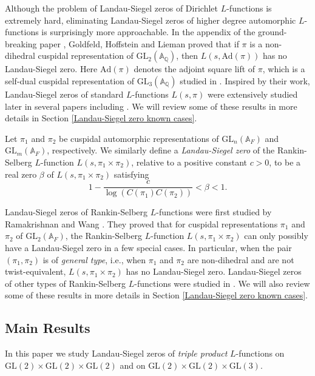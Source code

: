 \documentclass[12pt]{amsart}
\newcommand{\bA}{\mathbb{A}}
\newcommand{\Ad}{\text{Ad}}
\newcommand{\bQ}{\mathbb{Q}}
\newcommand{\GL}{\text{GL}}
\begin{document}
Although the problem of Landau-Siegel zeros of Dirichlet $L$-functions is extremely hard, eliminating Landau-Siegel zeros of higher degree automorphic $L$-functions is surprisingly more approachable. In the appendix of the ground-breaking paper \cite{HoffsteinLockhart1994}, Goldfeld, Hoffstein and Lieman proved that if $\pi$ is a non-dihedral cuspidal representation of $\GL_2(\bA_\bQ)$, then $L(s,\Ad(\pi))$ has no Landau-Siegel zero. Here $\Ad(\pi)$ denotes the adjoint square lift of $\pi$, which is a self-dual cuspidal representation of $\GL_3(\bA_\bQ)$ studied in \cite{GelbartJacquet1978}. Inspired by their work, Landau-Siegel zeros of standard $L$-functions $L(s,\pi)$ were extensively studied later in several papers including \cite{HoffsteinRamakrishnan1995}\cite{Banks1997}\cite{Thorner2021}\cite{Luo2023}. We will review some of these results in more details in Section \ref{Landau-Siegel zero known cases}.

Let $\pi_1$ and $\pi_2$ be cuspidal automorphic representations of $\GL_n(\bA_F)$ and $\GL_m(\bA_F)$, respectively. We similarly define a \textit{Landau-Siegel zero} of the Rankin-Selberg $L$-function $L(s,\pi_1 \times \pi_2)$, relative to a positive constant $c>0$, to be a real zero $\beta$ of $L(s,\pi_1 \times \pi_2)$ satisfying 
\begin{equation*}
    1-\frac{c}{\log (C(\pi_1)C(\pi_2))} < \beta < 1.
\end{equation*}

Landau-Siegel zeros of Rankin-Selberg $L$-functions were first studied by Ramakrishnan and Wang \cite{RamakrishnanWang2003}. They proved that for cuspidal representations $\pi_1$ and $\pi_2$ of $\GL_2(\bA_F)$, the Rankin-Selberg $L$-function $L(s,\pi_1 \times \pi_2)$ can only possibly have a Landau-Siegel zero in a few special cases. In particular, when the pair $(\pi_1,\pi_2)$ is of \textit{general type}, i.e., when $\pi_1$ and $\pi_2$ are non-dihedral and are not twist-equivalent, $L(s,\pi_1 \times \pi_2)$ has no Landau-Siegel zero. Landau-Siegel zeros of other types of Rankin-Selberg $L$-functions were studied in \cite{Luo2023}\cite{Thorner2025symmetricsquare}\cite{Thorner2025}. We will also review some of these results in more details in Section \ref{Landau-Siegel zero known cases}.

\subsection{Main Results}
In this paper we study Landau-Siegel zeros of \textit{triple product} $L$-functions on $\GL(2) \times \GL(2) \times \GL(2)$ and on $\GL(2) \times \GL(2) \times \GL(3)$.
\end{document}
